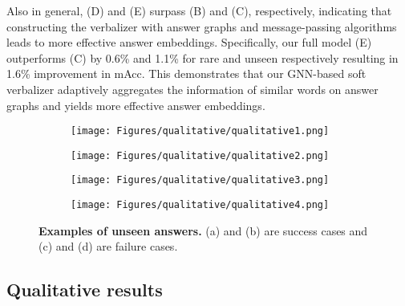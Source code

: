 \documentclass[10pt,twocolumn,letterpaper]{article}
\begin{document}
Also in general, (D) and (E) surpass (B) and (C), respectively, indicating that constructing the verbalizer with answer graphs and message-passing algorithms leads to more effective answer embeddings.
Specifically, our full model (E) outperforms (C) by 0.6\% and 1.1\% for rare and unseen respectively resulting in 1.6\% improvement in mAcc.
This demonstrates that our GNN-based soft verbalizer adaptively aggregates the information of similar words on answer graphs and yields more effective answer embeddings. \begin{figure}[t] 
    \vspace{-2mm}
    \centering
    \begin{subfigure}[t]{0.45\linewidth}
        \texttt{[image: Figures/qualitative/qualitative1.png]}        
        \vspace{-9mm}
        \caption{ }
        \label{fig:qualitative1}
    \end{subfigure}
    \begin{subfigure}[t]{0.45\linewidth}
        \texttt{[image: Figures/qualitative/qualitative2.png]}
        \vspace{-9mm}
        \caption{ }
        \vspace{3mm}
        \label{fig:qualitative2}
    \end{subfigure}
    \begin{subfigure}[t]{0.45\linewidth}
        \texttt{[image: Figures/qualitative/qualitative3.png]}
        \vspace{-18mm}
        \caption{ }
        \label{fig:qualitative3}
    \end{subfigure}
    \begin{subfigure}[t]{0.45\linewidth}
        \texttt{[image: Figures/qualitative/qualitative4.png]}
        \vspace{-18mm}
        \caption{ }
        \label{fig:qualitative4}
    \end{subfigure}
    \vspace{-8mm}
    \caption{\textbf{Examples of unseen answers.}
    (a) and (b) are success cases and (c) and (d) are failure cases.
    }
    \label{fig:qualitative}
\end{figure} \subsection{Qualitative results}
\end{document}
